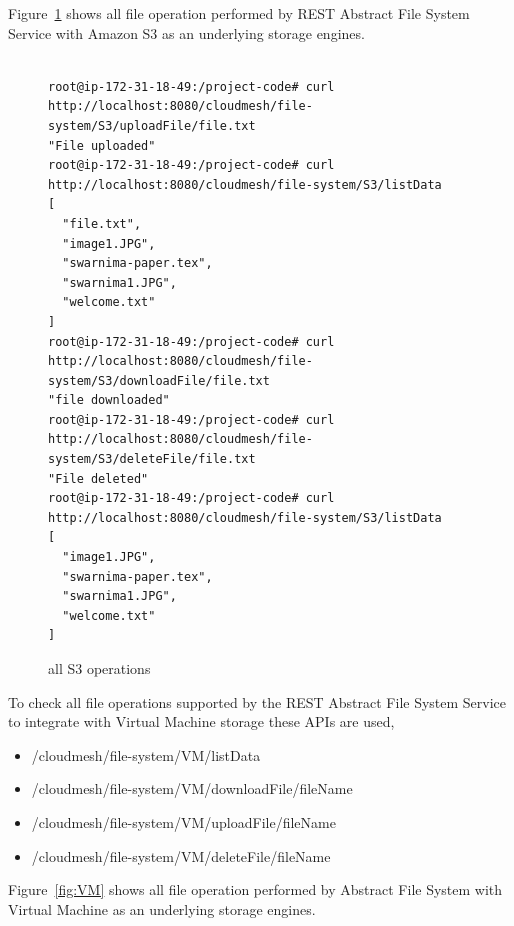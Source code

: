 Figure~\ref{fig:all-s3} shows all file operation performed by REST
Abstract File System Service with Amazon S3 as an underlying storage
engines.

\begin{figure}[!ht]
\begin{footnotesize}
\begin{verbatim}

root@ip-172-31-18-49:/project-code# curl 
http://localhost:8080/cloudmesh/file-system/S3/uploadFile/file.txt
"File uploaded"
root@ip-172-31-18-49:/project-code# curl 
http://localhost:8080/cloudmesh/file-system/S3/listData
[
  "file.txt",
  "image1.JPG",
  "swarnima-paper.tex",
  "swarnima1.JPG",
  "welcome.txt"
]
root@ip-172-31-18-49:/project-code# curl 
http://localhost:8080/cloudmesh/file-system/S3/downloadFile/file.txt
"file downloaded"
root@ip-172-31-18-49:/project-code# curl 
http://localhost:8080/cloudmesh/file-system/S3/deleteFile/file.txt
"File deleted"
root@ip-172-31-18-49:/project-code# curl 
http://localhost:8080/cloudmesh/file-system/S3/listData
[
  "image1.JPG",
  "swarnima-paper.tex",
  "swarnima1.JPG",
  "welcome.txt"
]

\end{verbatim}
\end{footnotesize}
\caption{all S3 operations}\label{fig:all-s3}
\end{figure}


To check all file operations supported by the REST Abstract File
System Service to integrate with Virtual Machine storage these APIs
are used,

\begin{itemize}
    \item /cloudmesh/file-system/VM/listData
    \item /cloudmesh/file-system/VM/downloadFile/{fileName}
    \item /cloudmesh/file-system/VM/uploadFile/{fileName}
    \item /cloudmesh/file-system/VM/deleteFile/{fileName}
\end{itemize}

Figure~\ref{fig:VM} shows all file operation performed by Abstract 
File System with Virtual Machine as an underlying storage engines. 

